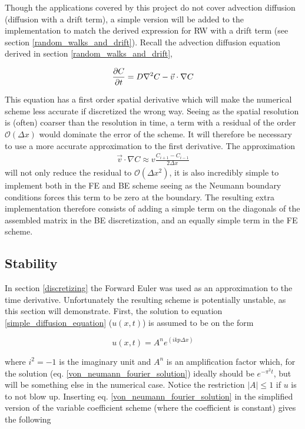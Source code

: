 Though the applications covered by this project do not cover advection diffusion (diffusion with a drift term), a simple version will be added to the implementation to match the derived expression for RW with a drift term (see section \ref{random_walks_and_drift}). 
Recall the advection diffusion equation derived in section \ref{random_walks_and_drift}, 

\begin{equation*} 
\frac{\partial C}{\partial t} = D\nabla^2 C -\vec v \cdot \nabla C
\end{equation*}

This equation has a first order spatial derivative which will make the numerical scheme less accurate if discretized the wrong way. 
Seeing as the spatial resolution is (often) coarser than the resolution in time, a term with a residual of the order $\mathcal{O}(\Delta x)$ would dominate the error of the scheme. 
It will therefore be necessary to use a more accurate approximation to the first derivative. 
The approximation 
\begin{align*}
 \vec v \cdot \nabla C \approx v\frac{C_{i+1}-C_{i-1}}{2\Delta x}
\end{align*}
will not only reduce the residual to $\mathcal{O}(\Delta x^2)$, it is also incredibly simple to implement both in the FE and BE scheme seeing as the Neumann boundary conditions forces this term to be zero at the boundary. The resulting extra implementation therefore consists of adding a simple term on the diagonals of the assembled matrix in the BE discretization, and an equally simple term in the FE scheme.



\subsection{Stability}\label{stability}

In section \ref{discretizing} the Forward Euler was used as an approximation to the time derivative. 
Unfortunately the resulting scheme is potentially unstable, as this section will demonstrate. 
First, the solution to equation \eqref{simple_diffusion_equation} ($u(x,t)$) is assumed to be on the form 

\begin{equation}\label{von_neumann_fourier_solution}
 u(x,t) = A^n e^{(ikp\Delta x)}
\end{equation}

where $i^2=-1$ is the imaginary unit and $A^n$ is an amplification factor which, for the solution (eq. \eqref{von_neumann_fourier_solution}) ideally should be $e^{-\pi^2t}$, but will be something else in the numerical case. 
Notice the restriction $\left|A\right|\leq 1$ if $u$ is to not blow up. 
Inserting eq. \eqref{von_neumann_fourier_solution} in the simplified version of the variable coefficient scheme (where the coefficient is constant) gives the following

